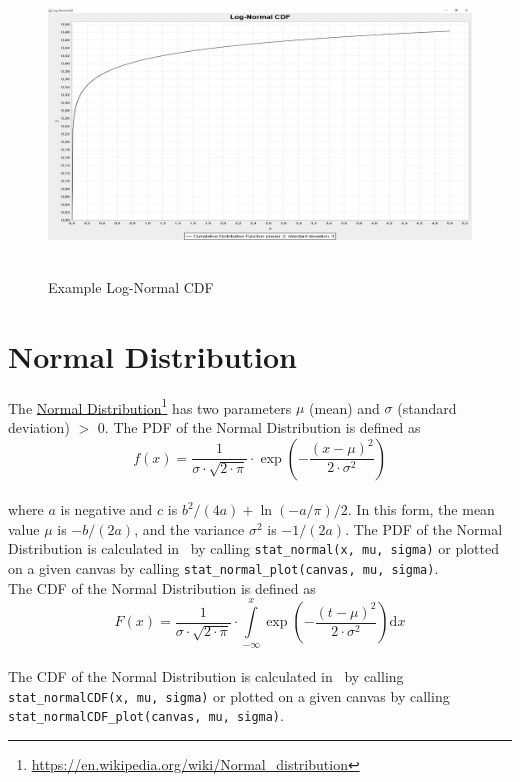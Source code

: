 		\begin{figure}[H]
			\centering
			\includegraphics[width=1\textwidth]{Figures/implemented_functions/log_normal_cdf}~\\
			\caption{Example Log-Normal CDF}
			\label{fig:log_normal_cdf}
		\end{figure}


	\section{Normal Distribution}
	
		The \href{https://en.wikipedia.org/wiki/Normal_distribution}{Normal Distribution}\footnote{\url{https://en.wikipedia.org/wiki/Normal_distribution}} has two parameters $\mu$ (mean) and $\sigma$ (standard deviation) $>$ 0. The \ac{PDF} of the Normal Distribution is defined as
		\\[0.3cm]
		$$f(x) = \frac{1}{\sigma \cdot \sqrt{2 \cdot \pi}} \cdot \exp\left(-\frac{(x-\mu)^2}{2 \cdot \sigma^2}\right)$$
		\\[0.3cm]
		where $a$ is negative and $c$ is $b^2/(4a)+\ln(-a/\pi)/2$. In this form, the mean value $\mu$ is $−b/(2a)$, and the variance $\sigma^2$ is $−1/(2a)$.
		The \ac{PDF} of the Normal Distribution is calculated in \setlx\ by calling \lstinline{stat_normal(x, mu, sigma)} or plotted on a given canvas by calling \lstinline{stat_normal_plot(canvas, mu, sigma)}.
		\\[0.3cm]
		The \ac{CDF} of the Normal Distribution is defined as
		\\[0.3cm]
		$$F(x) = \frac{1}{\sigma \cdot \sqrt{2 \cdot \pi}} \cdot 
			\int\limits_{-\infty}^x \exp\left(-\frac{(t-\mu)^2}{2 \cdot \sigma^2}\right) \mathrm{d}x$$
		\\[0.3cm]
		The \ac{CDF} of the Normal Distribution is calculated in \setlx\ by calling \lstinline{stat_normalCDF(x, mu, sigma)} or plotted on a given canvas by calling \lstinline{stat_normalCDF_plot(canvas, mu, sigma)}.

